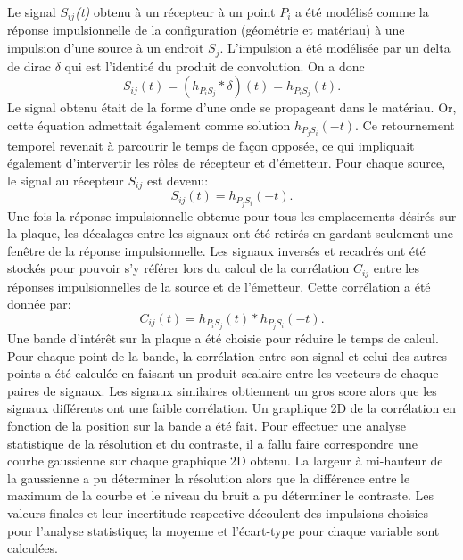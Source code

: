 \documentclass[conference]{IEEEtran}
\begin{document}
Le signal \textit{$S_{ij}$(t)} obtenu à un récepteur à un point \textit{$P_i$} a été
modélisé comme la réponse impulsionnelle de la configuration (géométrie et matériau) 
à une impulsion d'une source à un endroit \textit{$S_j$}. 
L'impulsion a été modélisée par un delta de dirac \textit{$\delta$} qui est 
l'identité du produit de convolution. On a donc
%
\[S_{ij}(t)=(h_{P_iS_j} * \delta)(t)=h_{P_iS_j}(t).\]
%
Le signal obtenu était de la forme d'une onde se propageant dans le matériau. Or, 
cette équation admettait également comme solution $h_{P_jS_i}(-t)$. Ce retournement
temporel revenait à parcourir le temps de façon opposée, ce qui impliquait également 
d'intervertir les rôles de récepteur et d'émetteur. 
%
Pour chaque source, le signal au récepteur \textit{$S_{ij}$} est devenu:
\[S_{ij}(t)=h_{P_jS_i}(-t).\]
Une fois la réponse impulsionnelle obtenue pour tous les emplacements désirés 
sur la plaque, les décalages entre les signaux ont été retirés en gardant seulement 
une fenêtre de la réponse impulsionnelle.
Les signaux inversés et recadrés ont été stockés pour pouvoir s'y 
référer lors du calcul de la corrélation \textit{$C_{ij}$} entre les réponses impulsionnelles de la 
source et de l'émetteur. 
Cette corrélation a été donnée par:
\[C_{ij}(t)=h_{P_iS_j}(t)*h_{P_jS_i}(-t).\]
%
Une bande d'intérêt sur la plaque a été choisie pour réduire le temps de calcul. 
Pour chaque point de la bande, la corrélation entre son signal et celui 
des autres points a été calculée en faisant un produit scalaire entre les vecteurs 
de chaque paires de signaux. Les signaux similaires obtiennent un gros score alors que
les signaux différents ont une faible corrélation.
Un graphique 2D de la corrélation en fonction de la position sur la bande a été fait. 
Pour effectuer une analyse statistique de la résolution et du contraste, il a fallu 
faire correspondre une courbe gaussienne sur chaque graphique 2D obtenu. 
La largeur à mi-hauteur de la gaussienne a pu déterminer la résolution alors que la 
différence entre le maximum de la courbe et le niveau du bruit a pu déterminer le contraste.
Les valeurs finales et leur incertitude respective découlent des impulsions choisies 
pour l'analyse statistique; la moyenne et l'écart-type pour chaque variable sont calculées.
\end{document}
